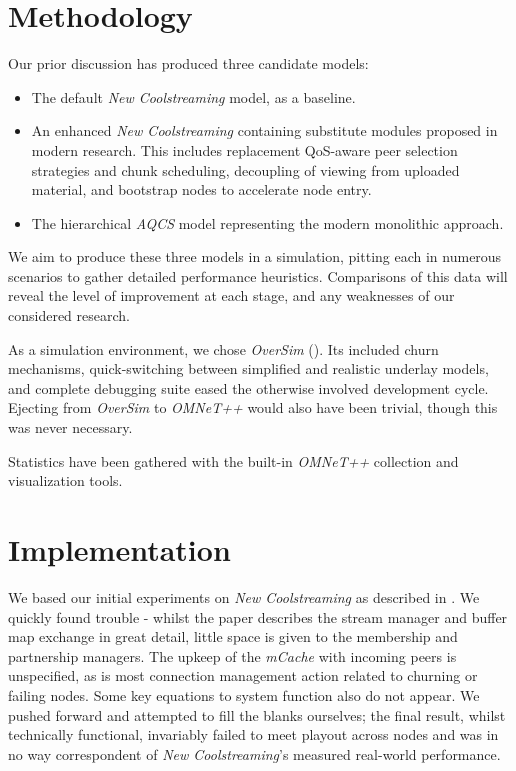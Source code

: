 \documentclass[12pt,a4paper]{article}
\begin{document}
\section{Methodology} \label{methodology}
Our prior discussion has produced three candidate models:

\begin{itemize}
	\item The default \textit{New Coolstreaming} model, as a baseline.
	\item An enhanced \textit{New Coolstreaming} containing substitute modules proposed in modern research. This includes replacement QoS-aware peer selection strategies and chunk scheduling, decoupling of viewing from uploaded material, and bootstrap nodes to accelerate node entry.
	\item The hierarchical \textit{AQCS} model representing the modern monolithic approach.
\end{itemize}

We aim to produce these three models in a simulation, pitting each in numerous scenarios to gather detailed performance heuristics. Comparisons of this data will reveal the level of improvement at each stage, and any weaknesses of our considered research.

As a simulation environment, we chose \textit{OverSim} (\cite{Baumgart2007}). Its included churn mechanisms, quick-switching between simplified and realistic underlay models, and complete debugging suite eased the otherwise involved development cycle. Ejecting from \textit{OverSim} to \textit{OMNeT++} would also have been trivial, though this was never necessary.

Statistics have been gathered with the built-in \textit{OMNeT++} collection and visualization tools.

\section{Implementation} \label{implementation}
We based our initial experiments on \textit{New Coolstreaming} as described in \cite{Li2008}. We quickly found trouble - whilst the paper describes the stream manager and buffer map exchange in great detail, little space is given to the membership and partnership managers. The upkeep of the \textit{mCache} with incoming peers is unspecified, as is most connection management action related to churning or failing nodes. Some key equations to system function also do not appear. We pushed forward and attempted to fill the blanks ourselves; the final result, whilst technically functional, invariably failed to meet playout across nodes and was in no way correspondent of \textit{New Coolstreaming}'s measured real-world performance.
\end{document}
